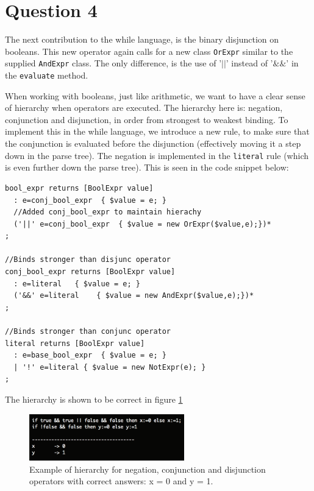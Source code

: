 \section*{Question 4}

The next contribution to the while language, is the binary disjunction on booleans. This new operator again calls for a new class \texttt{OrExpr} similar to the supplied \texttt{AndExpr} class. The only difference, is the use of '$||$' instead of '$\&\&$' in the \texttt{evaluate} method. 


When working with booleans, just like arithmetic, we want to have a clear sense of hierarchy when operators are executed. The hierarchy here is: negation, conjunction and disjunction, in order from strongest to weakest binding. To implement this in the while language, we introduce a new rule, to make sure that the conjunction is evaluated before the disjunction (effectively moving it a step down in the parse tree). The negation is implemented in the \texttt{literal} rule (which is even further down the parse tree). This is seen in the code snippet below:

\begin{lstlisting}
bool_expr returns [BoolExpr value]
  : e=conj_bool_expr  { $value = e; }
  //Added conj_bool_expr to maintain hierachy
  ('||' e=conj_bool_expr  { $value = new OrExpr($value,e);})*
;

//Binds stronger than disjunc operator
conj_bool_expr returns [BoolExpr value]
  : e=literal   { $value = e; }
  ('&&' e=literal    { $value = new AndExpr($value,e);})*
;

//Binds stronger than conjunc operator
literal returns [BoolExpr value]
  : e=base_bool_expr  { $value = e; }
  | '!' e=literal { $value = new NotExpr(e); }
;
\end{lstlisting}

The hierarchy is shown to be correct in figure \ref{fig:Q4ex}

\begin{figure}[H]
    \centering
    \includegraphics[width=0.6\textwidth]{fig/Q4example}
    \caption{Example of hierarchy for negation, conjunction and disjunction operators with correct answers: x = 0 and y = 1.}
    \label{fig:Q4ex}
\end{figure}

